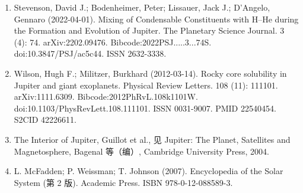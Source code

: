 \begin{enumerate}
\item Stevenson, David J.; Bodenheimer, Peter; Lissauer, Jack J.; D'Angelo, Gennaro (2022-04-01). Mixing of Condensable Constituents with H–He during the Formation and Evolution of Jupiter. The Planetary Science Journal. 3 (4): 74. arXiv:2202.09476. Bibcode:2022PSJ.....3...74S. doi:10.3847/PSJ/ac5c44. ISSN 2632-3338.
\item Wilson, Hugh F.; Militzer, Burkhard (2012-03-14). Rocky core solubility in Jupiter and giant exoplanets. Physical Review Letters. 108 (11): 111101. arXiv:1111.6309. Bibcode:2012PhRvL.108k1101W. doi:10.1103/PhysRevLett.108.111101. ISSN 0031-9007. PMID 22540454. S2CID 42226611.
\item The Interior of Jupiter, Guillot et al., 见 Jupiter: The Planet, Satellites and Magnetosphere, Bagenal 等（编）, Cambridge University Press, 2004.
\item L. McFadden; P. Weissman; T. Johnson (2007). Encyclopedia of the Solar System (第 2 版). Academic Press. ISBN 978-0-12-088589-3.
\end{enumerate}
